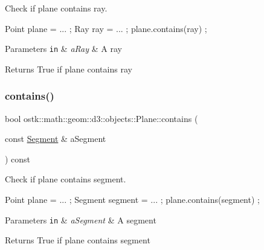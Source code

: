 Check if plane contains ray. 


\begin{DoxyCode}
Point plane = ... ;
Ray ray = ... ;
plane.contains(ray) ;
\end{DoxyCode}



\begin{DoxyParams}[1]{Parameters}
\mbox{\tt in}  & {\em a\+Ray} & A ray \\
\hline
\end{DoxyParams}
\begin{DoxyReturn}{Returns}
True if plane contains ray 
\end{DoxyReturn}
\mbox{\label{classostk_1_1math_1_1geom_1_1d3_1_1objects_1_1_plane_a229e30b431a2a2b8d00c02dbfba83e91}} 
\subsubsection{\texorpdfstring{contains()}{contains()}\hspace{0.1cm}{\footnotesize\ttfamily [5/5]}}
{\footnotesize\ttfamily bool ostk\+::math\+::geom\+::d3\+::objects\+::\+Plane\+::contains (\begin{DoxyParamCaption}\item[{const \hyperlink{classostk_1_1math_1_1geom_1_1d3_1_1objects_1_1_segment}{Segment} \&}]{a\+Segment }\end{DoxyParamCaption}) const}



Check if plane contains segment. 


\begin{DoxyCode}
Point plane = ... ;
Segment segment = ... ;
plane.contains(segment) ;
\end{DoxyCode}



\begin{DoxyParams}[1]{Parameters}
\mbox{\tt in}  & {\em a\+Segment} & A segment \\
\hline
\end{DoxyParams}
\begin{DoxyReturn}{Returns}
True if plane contains segment 
\end{DoxyReturn}
\mbox{\label{classostk_1_1math_1_1geom_1_1d3_1_1objects_1_1_plane_adad78a414d67a13cd87c9f5c569990ea}} 
